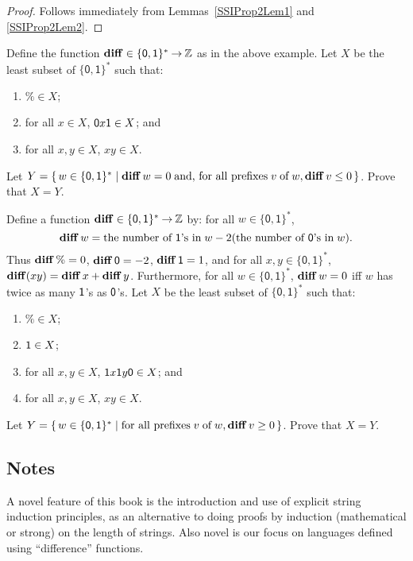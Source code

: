 \begin{proof}
Follows immediately from Lemmas~\ref{SSIProp2Lem1} and \ref{SSIProp2Lem2}.
\end{proof}

\begin{exercise}
Define the function $\mathbf{diff}\in\{\mathsf{0,1}\}^*\mathbin{\to}\mathbb{Z}$ as in the
above example.  Let $X$ be the least subset of $\{\mathsf{0,1}\}^*$
such that:
\begin{enumerate}[\quad(1)]
\item $\%\in X$;

\item for all $x\in X$, $\mathsf{0} x\mathsf{1}\in X$; and

\item for all $x,y\in X$, $xy\in X$.
\end{enumerate}
Let $Y=\{ \, w\in\{\mathsf{0,1}\}^* \mid \mathbf{diff}\,w=0\;\allowbreak\mbox{and,
for all prefixes}\allowbreak\;v\;\allowbreak\mbox{of}\allowbreak\;w,\mathbf{diff}\,v\leq 0 \, \}$.
Prove that $X=Y$.
\end{exercise}

\begin{exercise}
Define a function $\mathbf{diff}\in\{\mathsf{0,1}\}^*\mathbin{\to}\mathbb{Z}$ by:
for all $w\in\{\mathsf{0,1}\}^*$,
\begin{displaymath}
\mathbf{diff}\,w =
\allowbreak\mbox{the number of $\mathsf{1}$'s in}\allowbreak\;w -
2(\allowbreak\mbox{the number of $\mathsf{0}$'s in}\allowbreak\;w) .
\end{displaymath}
Thus $\mathbf{diff}\,\%=0$,
$\mathbf{diff}\,\mathsf{0} = -2$,
$\mathbf{diff}\,\mathsf{1} = 1$, and
for all $x,y\in\{\mathsf{0,1}\}^*$, $\mathbf{diff}(xy) = \mathbf{diff}\,x + \mathbf{diff}\,y$.
Furthermore, for all $w\in\{\mathsf{0,1}\}^*$,
$\mathbf{diff}\,w=0$ iff $w$ has twice as many $\mathsf{1}$'s as $\mathsf{0}$'s.
Let $X$ be the least subset of $\{\mathsf{0,1}\}^*$ such that:
\begin{enumerate}[\quad(1)]
\item $\%\in X$;

\item $\mathsf{1}\in X$;

\item for all $x,y\in X$, $\mathsf{1} x\mathsf{1} y\mathsf{0}\in X$; and

\item for all $x,y\in X$, $xy\in X$.
\end{enumerate}
Let $Y=\{ \, w\in\{\mathsf{0,1}\}^* \mid \allowbreak\mbox{for all
prefixes}\allowbreak\;v\;\allowbreak\mbox{of}\allowbreak\;w,\mathbf{diff}\,v\geq 0 \, \}$.
Prove that $X=Y$.
\end{exercise}

\subsection{Notes}

A novel feature of this book is the introduction and use of explicit
string induction principles, as an alternative to doing proofs by
induction (mathematical or strong) on the length of strings.  Also
novel is our focus on languages defined using ``difference''
functions.

